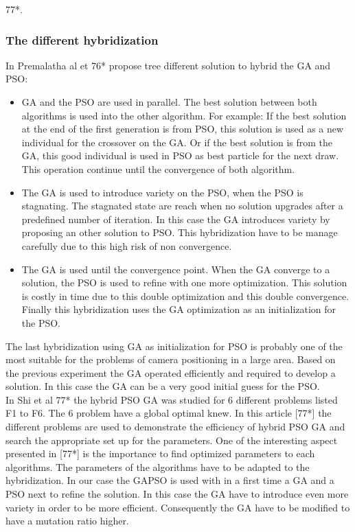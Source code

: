    77*\cite{c13}.
\subsubsection{The different hybridization }

In Premalatha al et 76*  propose tree different solution to hybrid the GA and PSO: 
\begin{itemize}
\item  GA and the PSO are used in parallel. The best solution between both algorithms is used into the other algorithm. 
For example: If the best solution at the end of the first generation is from PSO, this solution is used as a new individual for the crossover on the GA. Or if the best solution is from the GA, this good individual is used in PSO as best particle for the next draw. This operation continue until the convergence of both algorithm.   
 
\item The GA is used to introduce variety on the PSO, when the PSO is stagnating. The stagnated state are reach when no solution upgrades after a predefined number of iteration. In this case the GA introduces variety by proposing an other solution to PSO. This hybridization have to be manage carefully due to this high risk of non convergence. 

\item The GA is used until the convergence point. When the GA converge to a solution, the PSO is used to refine  with one more optimization. This solution is costly in time due to this double optimization and this double convergence. Finally this hybridization uses the GA optimization as an initialization for the PSO.\\
\end{itemize}

The last hybridization using GA as initialization for PSO is probably one of the most suitable for the problems of camera positioning in a large area. 
Based on the previous experiment the  GA operated efficiently  and required to develop a  %
solution.  %
In this case the GA can be a very good initial guess for the PSO. \\

In Shi et al 77*\cite{c13} the hybrid PSO GA was studied for 6 different problems listed F1 to F6. The 6 problem have a global optimal knew.  In this article [77*] the different problems are used to demonstrate the efficiency of hybrid PSO GA and search the appropriate set up for the parameters. One of the interesting aspect presented in [77*] is the importance to find optimized parameters to each algorithms. 
The parameters of the algorithms have to be adapted to the hybridization.
 In our case the GAPSO is used with in a first time a GA and a PSO next to refine the solution. In this case the GA have to introduce even more variety in order to be more efficient. Consequently the GA have to be modified to have a mutation ratio higher.   



